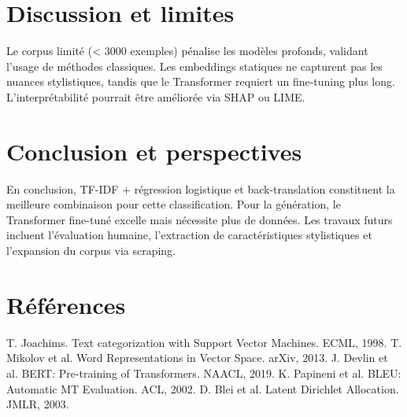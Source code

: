 \documentclass[a4paper,11pt]{article}
\begin{document}
\section{Discussion et limites}
Le corpus limité (< 3000 exemples) pénalise les modèles profonds, validant l’usage de méthodes classiques. Les embeddings statiques ne capturent pas les nuances stylistiques, tandis que le Transformer requiert un fine-tuning plus long. L’interprétabilité pourrait être améliorée via SHAP ou LIME.

\section{Conclusion et perspectives}
En conclusion, TF-IDF + régression logistique et back-translation constituent la meilleure combinaison pour cette classification. Pour la génération, le Transformer fine-tuné excelle mais nécessite plus de données. Les travaux futurs incluent l’évaluation humaine, l’extraction de caractéristiques stylistiques et l’expansion du corpus via scraping.

\section{Références}

\begin{thebibliography}{9}
   T. Joachims. Text categorization with Support Vector Machines. ECML, 1998.
   T. Mikolov et al. Word Representations in Vector Space. arXiv, 2013.
   J. Devlin et al. BERT: Pre-training of Transformers. NAACL, 2019.
   K. Papineni et al. BLEU: Automatic MT Evaluation. ACL, 2002.
   D. Blei et al. Latent Dirichlet Allocation. JMLR, 2003.
\end{thebibliography}
\end{document}
